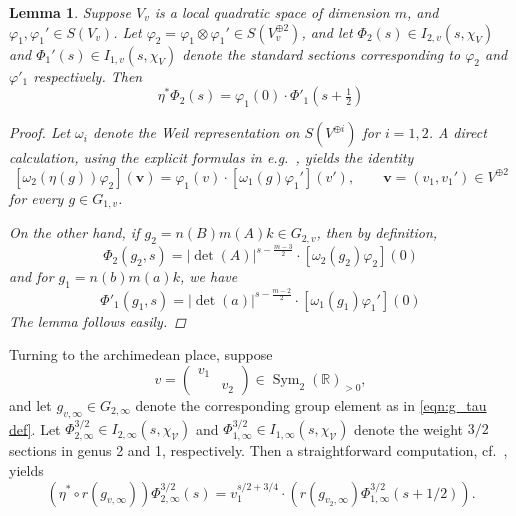 \documentclass[reqno,oneside]{amsart}
\theoremstyle{plain}
\newtheorem{lemma}[theorem]{Lemma}
\theoremstyle{remark}
\numberwithin{theorem}{section}
\newcommand{\bbR}{\mathbb R}
\newcommand{\calV}{\mathcal V}
\newcommand{\psm}[1]{\left( \begin{smallmatrix}#1 \end{smallmatrix} \right)}
\DeclareMathOperator{\Sym}{Sym}
\begin{document}
	\begin{lemma} \label{lem:pullback on Rallis sections}
		Suppose $V_v$ is a local quadratic space of dimension $m$, and $\varphi_1, \varphi_1' \in S(V_v)$. Let $\varphi_2 = \varphi_1 \otimes \varphi_1' \in S(V_v^{\oplus 2})$, and let $\Phi_2(s) \in I_{2,v}(s, \chi_V)$ and $\Phi_1'(s)  \in I_{1,v}(s, \chi_V)$ denote the  standard sections corresponding to $\varphi_2$ and $\varphi'_1$ respectively. Then
		\begin{equation}
		\eta^* \Phi_2(s) = \varphi_1(0) \cdot \Phi'_1(s+\tfrac12)
		\end{equation}
		
		\begin{proof}
			Let $\omega_i$ denote the Weil representation on $S(V^{\oplus i})$ for $i = 1, 2$. A direct calculation, using the explicit formulas in e.g.\ \cite[Lemma 8.6.5]{KRYbook}, yields the identity
			\begin{equation}
			\left[	\omega_2( \eta(g)) \varphi_2\right](\mathbf v)  = \varphi_1(v) \cdot \left[ \omega_1(g) \varphi_1' \right](v'), \qquad \mathbf v = (v_1, v_1') \in V^{\oplus 2}
			\end{equation}
			for every $g \in G_{1,v}$.
			
			On the other hand, if $g_2 = n(B) m(A) k \in G_{2,v}$, then by definition,
			\begin{equation}
			\Phi_2(g_2,s) = |\det (A)|^{s - \frac{m-3}2} \cdot \left[ \omega_2(g_2) \varphi_2 \right](0)
			\end{equation}
			and for $g_1 = n(b) m(a) k$, we have
			\begin{equation}
			\Phi'_1(g_1,s) = |\det (a)|^{s - \frac{m-2}2} \cdot \left[ \omega_1(g_1) \varphi_1' \right](0)
			\end{equation}
			The lemma follows easily.
		\end{proof}
	\end{lemma}
	
	Turning to the archimedean place, suppose
	\begin{equation}
	v = \psm{ v_1 & \\ & v_2 } \in \Sym_2(\bbR)_{>0},
	\end{equation}
	and let $g_{v, \infty} \in G_{2,\infty}$ denote the corresponding group element as in \eqref{eqn:g_tau def}. Let $\Phi_{2, \infty}^{3/2} \in I_{2,\infty}(s, \chi_{\calV})$ and $\Phi_{1,\infty}^{3/2} \in I_{1, \infty}(s, \chi_{\calV})$ denote the weight $3/2$ sections in genus 2 and 1, respectively. Then a straightforward computation, cf.\ \cite[p.\ 956]{GarciaSankaran}, yields
	\begin{equation} \label{eqn:arch section pullback}
	\left( \eta^* \circ r(g_{v,\infty}) \right) \Phi^{3/2}_{2, \infty}(s) =  v_1^{s/2 + 3/4} \cdot \left( r(g_{v_2,\infty}) \Phi^{3/2}_{1, \infty}(s+1/2) \right).
	\end{equation}
	
\end{document}
